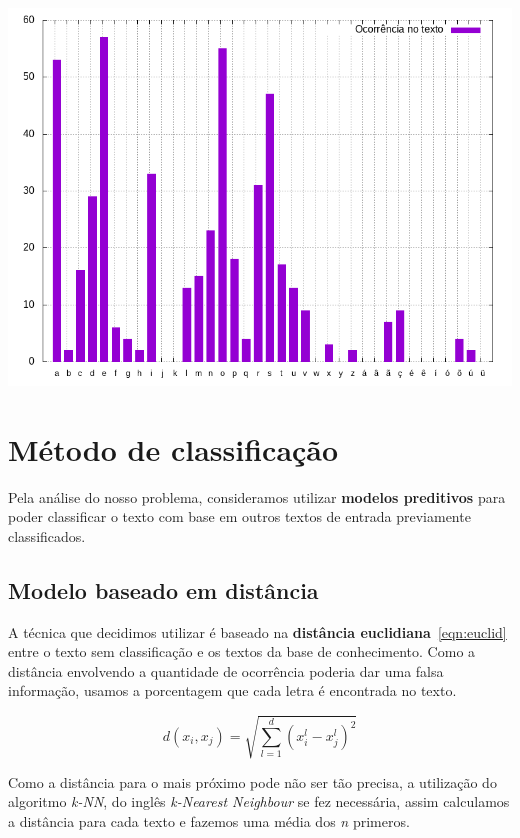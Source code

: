 \documentclass[a0,portrait]{a0poster}
\begin{document}
\begin{multicols}{2}
\begin{center}\vspace{1cm}
    \includegraphics[width=0.8\linewidth]{freq-ptbr.png}
\end{center}\vspace{1cm}

\section*{Método de classificação}
Pela análise do nosso problema, consideramos utilizar \textbf{modelos preditivos} para poder classificar o texto com base em outros textos de entrada previamente classificados.

\subsection*{Modelo baseado em distância}
A técnica que decidimos utilizar é baseado na \textbf{distância euclidiana}~\ref{eqn:euclid} entre o texto sem classificação e os textos da base de conhecimento. Como a distância envolvendo a quantidade de ocorrência poderia dar uma falsa informação, usamos a porcentagem que cada letra é encontrada no texto.

\vspace{0.5cm}
\begin{equation}
d(x_i, x_j) = \sqrt{\sum_{l=1}^{d} (x^l_i - x^l_j)^2}
\label{eqn:euclid}
\end{equation}\vspace{0.5cm}

Como a distância para o mais próximo pode não ser tão precisa, a utilização do algoritmo \emph{k-NN}, do inglês \emph{k-Nearest Neighbour} se fez necessária, assim calculamos a distância para cada texto e fazemos uma média dos \emph{n} primeros.


\end{multicols}
\end{document}
